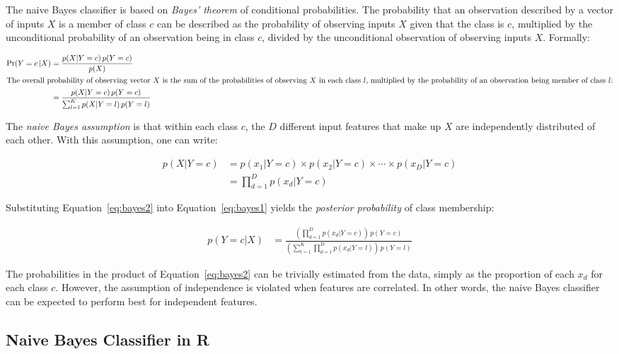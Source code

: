 The naive Bayes classifier is based on \emph{Bayes' theorem} of conditional probabilities. The probability that an observation described by a vector of inputs $X$ is a member of class $c$ can be described as the probability of observing inputs $X$ given that the class is $c$, multiplied by the unconditional probability of an observation being in class $c$, divided by the unconditional observation of observing inputs $X$. Formally:

\begin{align}
\Pr(Y=c\, | X) &= \frac{p(X|Y=c)\, p(Y=c)}{p(X)} \nonumber \\
\intertext{The overall probability of observing vector $X$ is the sum of the probabilities of observing $X$ in each class $l$, multiplied by the probability of an observation being member of class $l$:}
&= \frac{p(X|Y=c)\,p(Y=c) }{\sum_{l=1}^K p(X|Y=l)\,p(Y=l)}  \label{eq:bayes1}
\end{align}

The \emph{naive Bayes assumption} is that within each class $c$, the $D$ different input features that make up $X$ are independently distributed of each other. With this assumption, one can write:

\begin{align}
p(X | Y=c ) &= p(x_1 | Y=c) \times p(x_2 | Y=c) \times \cdots \times p(x_D | Y=c) \nonumber \\
            &= \prod_{d=1}^D p(x_d | Y=c) \label{eq:bayes2}
\end{align}

\noindent Substituting Equation~\ref{eq:bayes2} into Equation~\ref{eq:bayes1} yields the \emph{posterior probability} of class membership:

\begin{align*}
p(Y=c|X) &= \frac{\left(\prod_{d=1}^D p(x_d | Y=c)\right) \, p(Y=c)}{\left(\sum_{l=1}^K \prod_{d=1}^D p(x_d | Y=l)\right) \, p(Y=l) } 
\end{align*}

The probabilities in the product of Equation~\ref{eq:bayes2} can be trivially estimated from the data, simply as the proportion of each $x_d$ for each class $c$. However, the assumption of independence is violated when features are correlated. In other words, the naive Bayes classifier can be expected to perform best for independent features.

\subsection{Naive Bayes Classifier in R}

